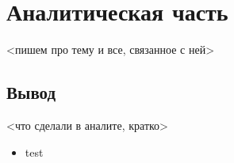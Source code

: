 \chapter{Аналитическая часть}

<пишем про тему и все, связанное с ней>

\section*{Вывод}

<что сделали в аналите, кратко>

\begin{itemize}
	\item test
\end{itemize}

\clearpage
